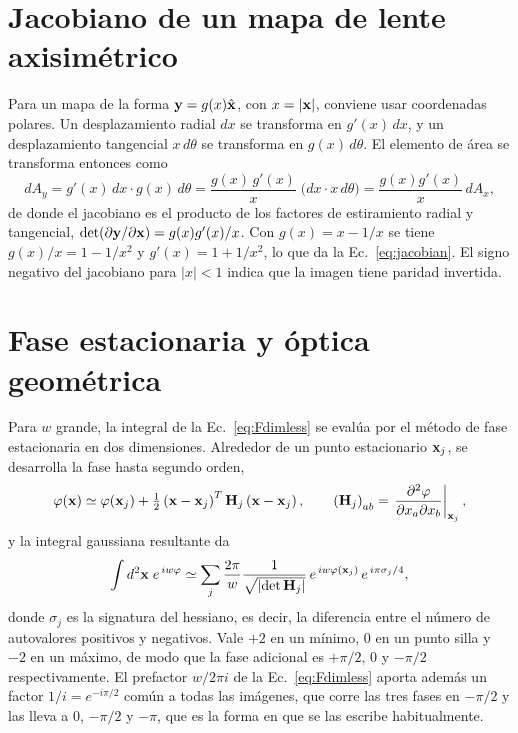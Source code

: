 \documentclass[11pt,a4paper,openany]{book}
\begin{document}
\section{Jacobiano de un mapa de lente axisim\'etrico}
\label{ap:jacobiano}

Para un mapa de la forma $\vb y=g(x)\hat{\vb x}$, con $x=|\vb x|$, conviene
usar coordenadas polares. Un desplazamiento radial $dx$ se transforma en
$g'(x)\,dx$, y un desplazamiento tangencial $x\,d\theta$ se transforma en
$g(x)\,d\theta$. El elemento de \'area se transforma entonces como
\begin{equation}
  dA_y=g'(x)\,dx\cdot g(x)\,d\theta
  =\frac{g(x)\,g'(x)}{x}\;\big(dx\cdot x\,d\theta\big)
  =\frac{g(x)g'(x)}{x}\,dA_x ,
  \label{eq:area_transform}
\end{equation}
de donde el jacobiano es el producto de los factores de estiramiento radial y
tangencial, $\det(\partial\vb y/\partial\vb x)=g(x)g'(x)/x$. Con
$g(x)=x-1/x$ se tiene $g(x)/x=1-1/x^{2}$ y $g'(x)=1+1/x^{2}$, lo que da la
Ec.~\eqref{eq:jacobian}. El signo negativo del jacobiano para $|x|<1$ indica
que la imagen tiene paridad invertida.

\section{Fase estacionaria y \'optica geom\'etrica}
\label{ap:fase_estacionaria}

Para $w$ grande, la integral de la Ec.~\eqref{eq:Fdimless} se eval\'ua por el
m\'etodo de fase estacionaria en dos dimensiones. Alrededor de un punto
estacionario $\vb x_j$, se desarrolla la fase hasta segundo orden,
\begin{equation}
  \varphi(\vb x)\simeq\varphi(\vb x_j)
  +\tfrac12\left(\vb x-\vb x_j\right)^{T}
  \mathbf{H}_j\left(\vb x-\vb x_j\right),
  \qquad
  \left(\mathbf{H}_j\right)_{ab}=\left.\pdv{\varphi}{x_a}{x_b}\right|_{\vb x_j} ,
  \label{eq:hessian}
\end{equation}
y la integral gaussiana resultante da
\begin{equation}
  \int d^{2}\vb x\;e^{\,iw\varphi}
  \simeq\sum_j\frac{2\pi}{w}
  \frac{1}{\sqrt{\left|\det\mathbf{H}_j\right|}}\,
  e^{\,iw\varphi(\vb x_j)}\,e^{\,i\pi\sigma_j/4} ,
  \label{eq:stationary_phase}
\end{equation}
donde $\sigma_j$ es la signatura del hessiano, es decir, la diferencia entre
el n\'umero de autovalores positivos y negativos. Vale $+2$ en un m\'inimo,
$0$ en un punto silla y $-2$ en un m\'aximo, de modo que la fase adicional es
$+\pi/2$, $0$ y $-\pi/2$ respectivamente. El prefactor $w/2\pi i$ de la
Ec.~\eqref{eq:Fdimless} aporta adem\'as un factor $1/i=e^{-i\pi/2}$ com\'un a
todas las im\'agenes, que corre las tres fases en $-\pi/2$ y las lleva a $0$,
$-\pi/2$ y $-\pi$, que es la forma en que se las escribe habitualmente.
\end{document}
